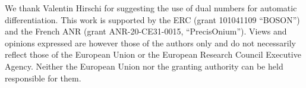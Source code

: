 \begin{acknowledgments}
We thank Valentin Hirschi for suggesting the use of dual numbers for automatic differentiation. This work is supported by the ERC (grant 101041109 ``BOSON'') and the French ANR (grant
ANR-20-CE31-0015, ``PrecisOnium''). Views and opinions expressed are however those of the authors only and do not necessarily reflect those of the European Union or the European Research Council Executive Agency. Neither the European Union nor the granting authority can be held responsible for them.
\end{acknowledgments}
